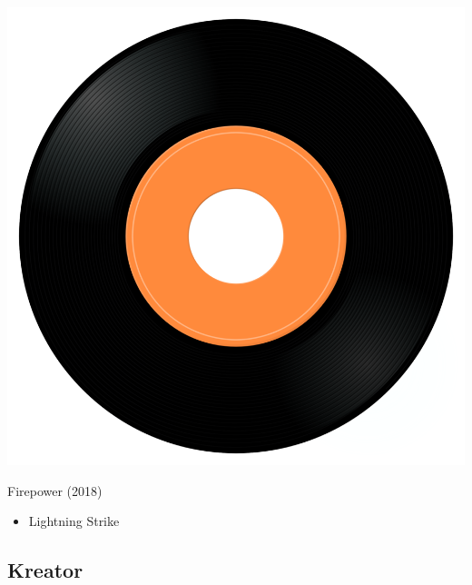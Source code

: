 \begin{minipage}[t]{0.25\textwidth}\vspace{0pt}
\captionsetup{type=figure}
\includegraphics[width=\textwidth]{Images/cover.png}
\caption*{Firepower (2018)}
\end{minipage}
\begin{minipage}[t]{0.25\textwidth}\vspace{0pt}
\begin{itemize}[nosep,leftmargin=1em,labelwidth=*,align=left]
	\setlength{\itemsep}{0pt}
	\item Lightning Strike
\end{itemize}
\end{minipage}

\subsection{Kreator}

